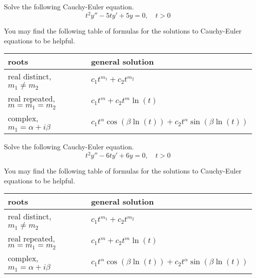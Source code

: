 \fi 

\ifnum {}
\question[8] Solve the following Cauchy-Euler equation. 
$$t^2y'' - 5ty' + 5y = 0, \quad t > 0$$

You may find the following table of formulas for the solutions to Cauchy-Euler equations to be helpful. 

\begin{center}
    \begin{tabular}{ p{6.2cm} p{6cm} }
        roots &  general solution 
        \\[2pt] \hline 
        real distinct, $m_1 \ne m_2$ &  $c_1 t^{m_1} + c_2 t^{m_2}$\\       
        real repeated, $m = m_1 = m_2$ & $c_1 t^{m} + c_2 t^m \ln(t)$\\
        complex, $m_1 = \alpha + i \beta$ & $c_1t^{\alpha}\cos(\beta \ln(t)) + c_2t^{\alpha}\sin(\beta \ln (t))$\\[2pt] \hline
    \end{tabular}    
\end{center}

\fi 

\ifnum {}
\question[8] Solve the following Cauchy-Euler equation. 
$$t^2y'' - 6ty' + 6y = 0, \quad t > 0$$

You may find the following table of formulas for the solutions to Cauchy-Euler equations to be helpful. 

\begin{center}
    \begin{tabular}{ p{6.2cm} p{6cm} }
        roots &  general solution 
        \\[2pt] \hline 
        real distinct, $m_1 \ne m_2$ &  $c_1 t^{m_1} + c_2 t^{m_2}$\\       
        real repeated, $m = m_1 = m_2$ & $c_1 t^{m} + c_2 t^m \ln(t)$\\
        complex, $m_1 = \alpha + i \beta$ & $c_1t^{\alpha}\cos(\beta \ln(t)) + c_2t^{\alpha}\sin(\beta \ln (t))$\\[2pt] \hline
    \end{tabular}    
\end{center}

\fi 











